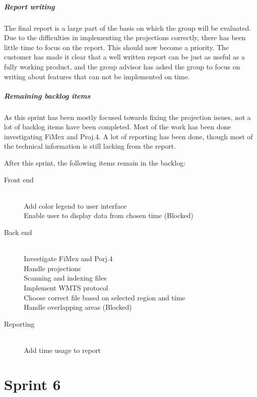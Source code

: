 \documentclass[11pt,a4paper,titlepage,oneside]{report}
\begin{document}
\paragraph{Report writing}
The final report is a large part of the basis on which the group will be evaluated. Due to the difficulties in implementing the projections correctly, there has been little time to focus on the report. This should now become a priority. The customer has made it clear that a well written report can be just as useful as a fully working product, and the group advisor has asked the group to focus on writing about features that can not be implemented on time. 

\paragraph{Remaining backlog items}
As this sprint has been mostly focused towards fixing the projection issues, not a lot of backlog items have been completed. Most of the work has been done investigating FiMex and Proj.4. A lot of reporting has been done, though most of the technical information is still lacking from the report. 

After this sprint, the following items remain in the backlog:

\begin{description}
	\item[Front end] \hfill \\
	Add color legend to user interface \hfill \\
	Enable user to display data from chosen time (Blocked)
	\item[Back end] \hfill \\
	Investigate FiMex and Porj.4 \hfill \\
	Handle projections \hfill \\
	Scanning and indexing files \hfill \\
	Implement WMTS protocol \hfill \\
	Choose correct file based on selected region and time \hfill \\
	Handle overlapping areas (Blocked)
	\item[Reporting] \hfill \\
	Add time usage to report
\end{description}

\chapter{Sprint 6}
\end{document}
